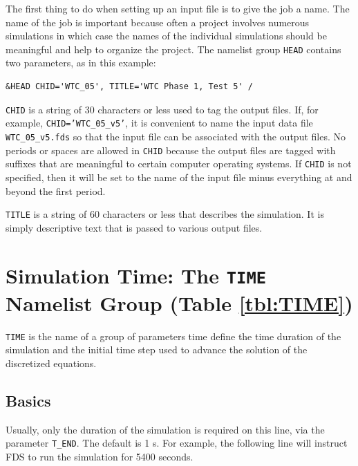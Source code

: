 \documentclass[11pt]{book}
\newcommand{\ct}{\tt\small}
\begin{document}
The first thing to do when setting up an input file is to give the
job a name.  The name of the job is important because often a project
involves numerous simulations in which case the names of the individual
simulations should be meaningful and help to organize the project.  The namelist group {\ct HEAD} contains
two parameters, as in this example:

\footnotesize
\begin{verbatim}
&HEAD CHID='WTC_05', TITLE='WTC Phase 1, Test 5' /
\end{verbatim}
\normalsize

\begin{description}
\item {\ct CHID} is a string of 30 characters or less used to tag the output files.
If, for example, {\ct CHID='WTC\_05\_v5'}, it is convenient to
name the input data file {\ct WTC\_05\_v5.fds} so that the input file
can be associated with the output files. No periods or spaces are allowed in
{\ct CHID} because the output files are tagged with suffixes that
are meaningful to certain computer operating systems.  If {\ct CHID} is not
specified, then it will be set to the name of the input file minus everything at and beyond the first period.
\item {\ct TITLE} is a string of 60 characters or less that describes the
simulation. It is simply descriptive text that is passed to various output files.
\end{description}


\section{Simulation Time: The \texorpdfstring{{\tt TIME}}{TIME} Namelist Group (Table \ref{tbl:TIME})}
\label{info:TIME}

{\ct TIME} is the name of a group of parameters time define the time
duration of the simulation and the initial time step used to advance
the solution of the discretized equations.

\subsection{Basics}
\label{info:TIME_Basics}

Usually, only the
duration of the simulation is required on this line, via the
parameter {\ct T\_END}. The default is 1 s.
For example, the following line will instruct FDS to run the simulation for 5400 seconds.
\end{document}
